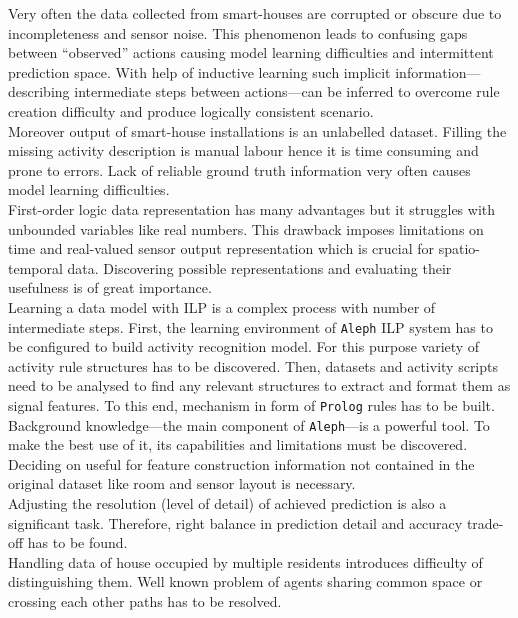 \documentclass[11pt, a4paper, pdflatex, leqno, twoside, openright]{report}
\begin{document}
Very often the data collected from smart-houses are corrupted or obscure due to incompleteness and sensor noise. This phenomenon leads to confusing gaps between ``observed'' actions causing model learning difficulties and intermittent prediction space. With help of inductive learning such implicit information---describing intermediate steps between actions---can be inferred to overcome rule creation difficulty and produce logically consistent scenario.\\
Moreover output of smart-house installations is an unlabelled dataset. Filling the missing activity description is manual labour hence it is time consuming and prone to errors. Lack of reliable ground truth information very often causes model learning difficulties.\\

First-order logic data representation has many advantages but it struggles with unbounded variables like real numbers. This drawback imposes limitations on time and real-valued sensor output representation which is crucial for spatio-temporal data. Discovering possible representations and evaluating their usefulness is of great importance.\\

Learning a data model with ILP is a complex process with number of intermediate steps. First, the learning environment of \texttt{Aleph} ILP system has to be configured to build activity recognition model. For this purpose variety of activity rule structures has to be discovered. Then, datasets and activity scripts need to be analysed to find any relevant structures to extract and format them as signal features. To this end, mechanism in form of \texttt{Prolog} rules has to be built.\\
Background knowledge---the main component of \texttt{Aleph}---is a powerful tool. To make the best use of it, its capabilities and limitations must be discovered. Deciding on useful for feature construction information not contained in the original dataset like room and sensor layout is necessary.\\

Adjusting the resolution (level of detail) of achieved prediction is also a significant task. Therefore, right balance in prediction detail and accuracy trade-off has to be found.\\
Handling data of house occupied by multiple residents introduces difficulty of distinguishing them. Well known problem of agents sharing common space or crossing each other paths has to be resolved.\\
\end{document}
